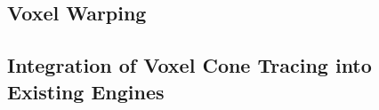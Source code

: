 \subsection{Voxel Warping}


\subsection{Integration of Voxel Cone Tracing into Existing Engines}







